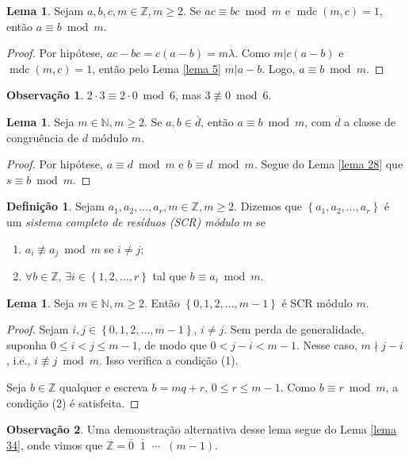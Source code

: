 \documentclass[a4paper,11pt,twoside, leqno]{article}
\DeclareMathOperator{\mdc}{mdc}
\theoremstyle{definition}
\newtheorem*{definition}{Definição}
\newtheorem{lemma}[theorem]{Lema}
\newtheorem{remark}{Observação}[section]
\begin{document}
\begin{lemma}
	\label{lema 35}
	Sejam $a,b,c,m\in\mathbb{Z}, m\geq 2$. Se $ac\equiv bc\bmod m$ e $\mdc(m,c)=1$, então $a\equiv b\bmod m$.
\end{lemma}
\begin{proof}
	Por hipótese, $ac - bc = c(a-b) = m\lambda$. Como $m|c(a-b)$ e $\mdc(m,c)=1$, então pelo Lema \eqref{lema 5} $m|a-b$. Logo, $a\equiv b\bmod m$. 
\end{proof}
\begin{remark}
	$2\cdot 3\equiv 2\cdot 0\bmod 6$, mas $3\not\equiv 0\bmod 6$.
\end{remark}
\begin{lemma}
	\label{lema 36}
	Seja $m\in\mathbb{N}, m\geq 2$. Se $a,b\in\overline{d}$, então $a\equiv b\bmod m$, com $\overline{d}$ a classe de congruência de $d$ módulo $m$.
\end{lemma}
\begin{proof}
	Por hipótese, $a\equiv d\bmod m$ e $b\equiv d\bmod m$. Segue do Lema \eqref{lema 28} que $s\equiv b\bmod m$.
\end{proof}
\begin{definition}
	Sejam $a_1, a_2, \dots, a_r,m\in\mathbb{Z}, m\geq 2$. Dizemos que $\left\{a_1, a_2, \dots, a_r \right\}$ é um {\em sistema completo de resíduos (SCR) módulo} $m$ se
	\begin{enumerate}[(1)]
		\item $a_i\not\equiv a_j\bmod m$ se $i\neq j$;
		\item $\forall b\in\mathbb{Z}$, $\exists i\in\left\{1,2,\dots,r \right\}$ tal que $b\equiv a_i\bmod m$.
	\end{enumerate}
\end{definition}
\begin{lemma}
	\label{lema 37}
	Seja $m\in\mathbb{N}, m\geq 2$. Então $\left\{0,1,2,\dots,m-1\right\}$ é SCR módulo $m$.
\end{lemma}
\begin{proof}
	Sejam $i,j\in\left\{0,1,2,\dots, m-1\right\}$, $i\neq j$. Sem perda de generalidade, suponha $0\leq i < j\leq m-1$, de modo que $0 < j-i < m-1$. Nesse caso, $m\nmid j-i$, i.e., $i\not\equiv j\bmod m$. Isso verifica a condição (1).
	
	Seja $b\in\mathbb{Z}$ qualquer e escreva $b = mq+r$, $0\leq r\leq m-1$. Como $b\equiv r\bmod m$, a condição (2) é satisfeita.
\end{proof}
\begin{remark}
	Uma demonstração alternativa desse lema segue do Lema \eqref{lema 34}, onde vimos que $\mathbb{Z} = \overline{0} \mathop{\dot\cup} \overline{1} \mathop{\dot\cup} \cdots \mathop{\dot\cup} \overline{(m-1)}$.
\end{remark}
\end{document}
